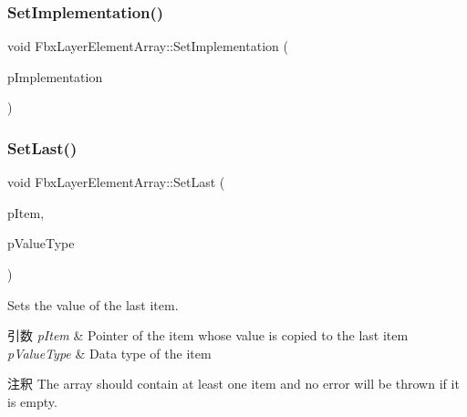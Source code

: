 \subsubsection{\texorpdfstring{Set\+Implementation()}{SetImplementation()}}
{\footnotesize\ttfamily void Fbx\+Layer\+Element\+Array\+::\+Set\+Implementation (\begin{DoxyParamCaption}\item[{void $\ast$}]{p\+Implementation }\end{DoxyParamCaption})\hspace{0.3cm}{\ttfamily [protected]}}

\mbox{\label{class_fbx_layer_element_array_a05706c8479fb3d84325a41464d7fa9dd}} 
\subsubsection{\texorpdfstring{Set\+Last()}{SetLast()}\hspace{0.1cm}{\footnotesize\ttfamily [1/2]}}
{\footnotesize\ttfamily void Fbx\+Layer\+Element\+Array\+::\+Set\+Last (\begin{DoxyParamCaption}\item[{const void $\ast$}]{p\+Item,  }\item[{\hyperlink{fbxpropertytypes_8h_a73913a5ddfb20e57c6f25e9e6784bd92}{E\+Fbx\+Type}}]{p\+Value\+Type }\end{DoxyParamCaption})}

Sets the value of the last item. 
\begin{DoxyParams}{引数}
{\em p\+Item} & Pointer of the item whose value is copied to the last item \\
\hline
{\em p\+Value\+Type} & Data type of the item \\
\hline
\end{DoxyParams}
\begin{DoxyRemark}{注釈}
The array should contain at least one item and no error will be thrown if it is empty. 
\end{DoxyRemark}
\mbox{\label{class_fbx_layer_element_array_aebc103a4f95690e6aef3961b6198df3d}} 
